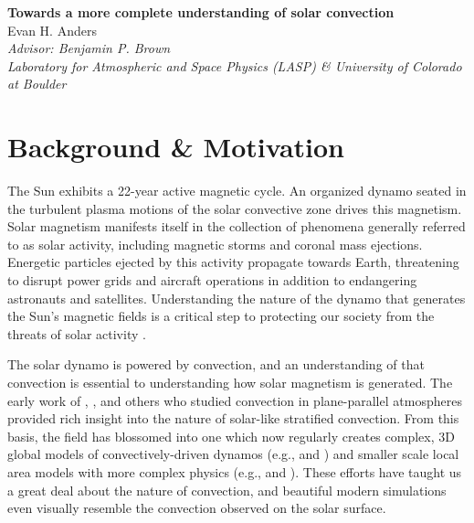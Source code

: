 \documentclass[aasms,12pt]{article}
\begin{document}
\begin{center}
   \large\textbf{Towards a more complete understanding of solar convection}\\
   \vspace{0.4cm}
   \large{Evan H. Anders}\\
   \vspace{0.4cm}
   \normalsize\textit{Advisor: Benjamin P. Brown}\\
   \normalsize\textit{Laboratory for Atmospheric and Space Physics (LASP) \& University of Colorado at Boulder}\\
\end{center}

\section{Background \& Motivation}
The Sun exhibits a 22-year active magnetic cycle.
An organized dynamo seated in the turbulent plasma
motions of the solar convective zone drives this magnetism.
Solar magnetism manifests itself in the collection of phenomena generally
referred to as solar activity, including magnetic storms and coronal mass
ejections.  Energetic particles ejected by this activity propagate towards Earth, 
threatening to disrupt power grids and aircraft operations in addition to endangering astronauts and satellites.
Understanding the nature of the dynamo that generates the Sun's magnetic fields is a critical
step to protecting our society from the threats of solar activity \citep{charbonneau2014}.

The solar dynamo is powered by convection, and
an understanding of that convection is essential to understanding
how solar magnetism is generated. The early work of \cite{graham1975}, \cite{hurlburt&all1984},
and others who studied convection in plane-parallel atmospheres
provided rich insight into the nature of solar-like stratified convection.  From this basis,
the field has blossomed into one which now regularly creates complex, 3D global models of convectively-driven
dynamos (e.g., \cite{brown&all2010} and \cite{guerrero&all2016})
and smaller scale local area models with more complex physics 
(e.g., \cite{stein&nordlund2012} and \cite{rempel2014}).
These efforts have taught us a great deal about the nature of convection, and
beautiful modern simulations even visually resemble the convection observed on the solar surface.
\end{document}
